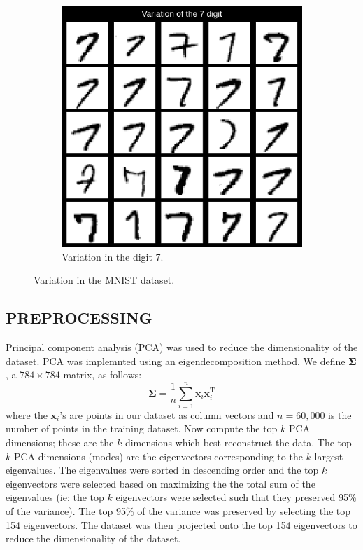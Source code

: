 \documentclass[12pt]{article}
\begin{document}
\begin{figure}[htbp]
\begin{subfigure}[b]{0.45\textwidth}
        \includegraphics[width=\textwidth]{sevens.png}
        \caption{Variation in the digit 7.}
        \label{fig:sevens}
    \end{subfigure}
    \caption{Variation in the MNIST dataset.}
    \label{fig:variation}
\end{figure}

\subsection*{PREPROCESSING}
Principal component analysis (PCA) was used to reduce the dimensionality of the dataset. 
PCA was implemnted using an eigendecomposition method. We define 
$\boldsymbol{\mathbf{\Sigma}}$, a $784 \times 784$ matrix, as follows: 
\[
\boldsymbol{\mathbf{\Sigma}} = \frac{1}{n} \sum_{i=1}^n \boldsymbol{\mathbf{x}}_i {\boldsymbol{\mathbf{x}}}^{\mathrm{T}}_i
\]
where the $\boldsymbol{\mathbf{x}}_i$’s are points in our dataset as column vectors and $n = 60,000$ is the number 
of points in the training dataset. Now compute the top $k$ PCA dimensions; these are the $k$ dimensions which best 
reconstruct the data. The top $k$ PCA dimensions (modes) are the eigenvectors corresponding to the $k$ largest eigenvalues.
The eigenvalues were sorted in descending order and the top $k$ eigenvectors were selected based on maximizing the
the total sum of the eigenvalues (ie: the top $k$ eigenvectors were selected such that they preserved 95\% of the variance).
The top 95\% of the variance was preserved by selecting the top 154 eigenvectors. The dataset was then projected onto
the top 154 eigenvectors to reduce the dimensionality of the dataset. \\
\end{document}
